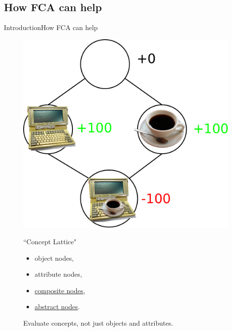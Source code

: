\subsection{How FCA can help}
\begin{frame}{Introduction}{How FCA can help}

\begin{figure}[ht]
\begin{minipage}[t]{0.55\linewidth}
\vspace{0pt}
\centering
\includegraphics[width=\textwidth]{img/introduction/fca_coffee.pdf}
\end{minipage}
\hfill
\begin{minipage}[t]{0.40\linewidth}
\vspace{0pt}
\begin{block}{``Concept Lattice"}
\begin{itemize}
\item object nodes,
\item attribute nodes,
\item \underline{composite nodes},
\item \underline{abstract nodes}.
\end{itemize}
Evaluate concepts, not just objects and attributes.
\end{block}
\end{minipage}
\end{figure}

\end{frame}